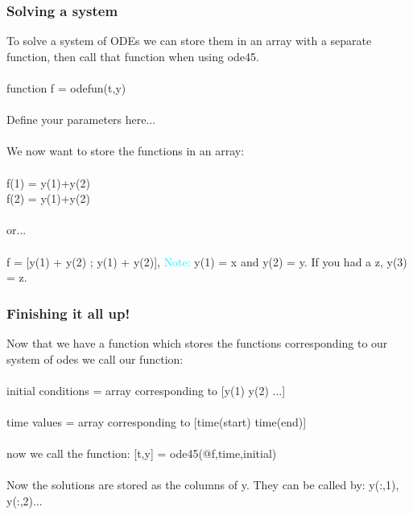 \documentclass{beamer}
\begin{document}
\begin{frame}
\frametitle{Solving a system}

To solve a system of ODEs we can store them in an array with a separate function, then call that function when using ode45. \\
\ \\
function f = odefun(t,y)\\
\ \\
Define your parameters here...\\
\ \\ 
We now want to store the functions in an array: \\
\ \\
f(1) = y(1)+y(2)\\
f(2) = y(1)+y(2)\\ 
\ \\
or...\\
\ \\
f = [y(1) + y(2) ; y(1) + y(2)],   \textcolor{cyan}{Note:} y(1) = x and y(2) = y. If you had a z, y(3) = z. 

\end{frame}
\begin{frame}
\frametitle{Finishing it all up!} 
Now that we have a function which stores the functions corresponding to our system of odes we call our function: \\
\ \\
initial conditions = array corresponding to [y(1) y(2) ...]\\ 
\ \\
time values = array corresponding to [time(start) time(end)]\\
\ \\
now we call the function: 
[t,y] = ode45(@f,time,initial)\\
\ \\
Now the solutions are stored as the columns of y. They can be called by: y(:,1), y(:,2)...
\end{frame}
%
\end{document}
